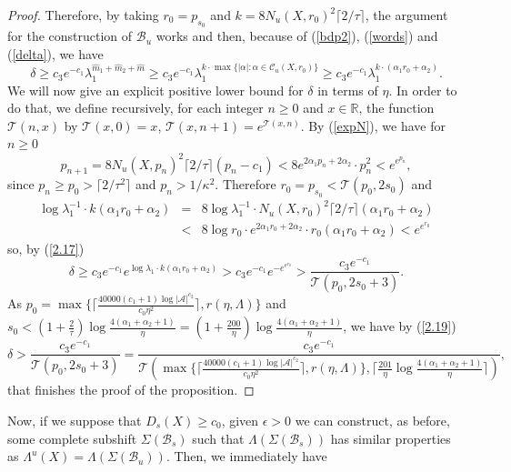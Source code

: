 \documentclass[12pt]{amsart}
\providecommand{\abs}[1]{\lvert#1\rvert}
\theoremstyle{plain} %
\theoremstyle{definition} %
\numberwithin{equation}{section}
\begin{document}
\begin{proof}
Therefore, by taking $r_0=p_{s_0}$ and $k=8 N_u(X,r_0)^2\lceil2/\tau\rceil$, the argument for the construction of $\mathcal{B}_u$ works and then, because of (\ref{bdp2}), (\ref{words}) and (\ref{delta}), we have
\begin{equation} \label{2.17}
 \delta \geq c_3e^{-c_1}\lambda_1^{\widehat{m}_1+\widehat{m}_2+\widehat{m}} \geq c_3e^{-c_1}\lambda_1^{k\cdot \max \{ \abs{\alpha}:\alpha \in \mathcal{C}_u(X,r_0)   \}} \geq c_3e^{-c_1}\lambda_1^{k\cdot(\alpha_1r_0+\alpha_2)}.  
\end{equation}
We will now give an explicit positive lower bound for $\delta$ in terms of $\eta$. In order to do that, we define recursively, for each integer $n \geq 0$ and $x \in \mathbb{R}$, the function $\mathcal{T}(n,x)$ by $\mathcal{T}(x,0)=x$, $\mathcal{T}(x,n+1)=e^{\mathcal{T}(x,n)}$. By (\ref{expN}), we have for $n \geq0$
$$p_{n+1}=8 N_u(X,p_n)^2\lceil2/\tau\rceil(p_n -c_1)<  8e^{2\alpha_1p_n+2\alpha_2}\cdot p_n^2 < e^{e^{p_n}}, $$
since $p_n \geq p_0 > \lceil2/\tau^2\rceil$ and $p_n > 1/\kappa^2$.  Therefore $r_0=p_{s_0} < \mathcal{T}(p_0,2s_0)$ and
\begin{eqnarray*}\label{lala}
\log \lambda_1^{-1}\cdot k(\alpha_1 r_0+\alpha_2) &=& 8\log \lambda_1^{-1}\cdot N_u(X,r_0)^2\lceil2/\tau\rceil (\alpha_1 r_0+\alpha_2)\\ &<&   8\log r_0\cdot e^{2\alpha_1r_0+2\alpha_2} \cdot r_0(\alpha_1 r_0+\alpha_2) < e^{e^{r_0}} 
\end{eqnarray*} 
so, by (\ref{2.17})
\begin{equation} \label{2.19}
  \delta \geq c_3e^{-c_1}e^{\log \lambda_1 \cdot k(\alpha_1r_0+\alpha_2)}> c_3e^{-c_1}e^{-e^{e^{r_0}}} > \frac{c_3e^{-c_1}}{\mathcal{T}(p_0,2s_0+3)}.
\end{equation}
As $p_0=\max \{ \lceil\frac{40000(c_1+1)\log|\mathcal{A}|^{c_2}}{c_0\eta^2}\rceil, r(\eta,\Lambda) \}$ and $s_0<(1+\frac{2}{\tau})\log \frac{4(\alpha_1+\alpha_2+1)}{\eta}= (1+\frac{200}{\eta})\log \frac{4(\alpha_1+\alpha_2+1)}{\eta}$, we have by (\ref{2.19})
$$\delta > \frac{c_3e^{-c_1}}{\mathcal{T}(p_0,2s_0+3)} = \frac{c_3e^{-c_1}}{\mathcal{T}(\max \{ \lceil\frac{40000(c_1+1)\log|\mathcal{A}|^{c_2}}{c_0\eta^2}\rceil, r(\eta,\Lambda) \},\lceil \frac{201}{\eta}\log \frac{4(\alpha_1+\alpha_2+1)}{\eta}\rceil)},$$
that finishes the proof of the proposition.
\end{proof}
Now, if we suppose that $D_s(X)\geq c_0$, given $\epsilon>0$ we can construct, as before, some complete subshift $\Sigma(\mathcal{B}_s)$ such that $\Lambda(\Sigma(\mathcal{B}_s))$ has similar properties as $\Lambda^u(X)=\Lambda(\Sigma(\mathcal{B}_u))$. Then, we immediately have
\end{document}
